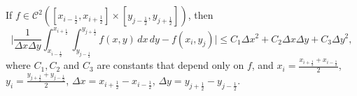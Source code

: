\begin{thrm}
	\label{prop-bound-midpoint2d}
	If $f \in \mathcal{C}^2([x_{i-\frac{1}{2}},x_{i+\frac{1}{2}}]\times [y_{j-\frac{1}{2}},y_{j+\frac{1}{2}}])$, then 
	\begin{equation}
		\bigg|\frac{1}{\Delta x \Delta y}\int_{x_{i-\frac{1}{2}}}^{x_{i+\frac{1}{2}}}
		\int_{y_{j-\frac{1}{2}}}^{y_{j+\frac{1}{2}}}{f(x,y)\,dx \,dy}-f(x_i,y_j)\bigg| \leq C_1 \Delta x^2 + C_2 \Delta x \Delta y + C_3 \Delta y^2, 
	\end{equation}
	where $C_1, C_2$  and $C_3$ are constants that depend only on $f$, and $x_i = \frac{x_{i+\frac{1}{2}} + x_{i-\frac{1}{2}}}{2}$,
	$y_i = \frac{y_{j+\frac{1}{2}} + y_{j-\frac{1}{2}}}{2}$, $\Delta x = x_{i+\frac{1}{2}}-x_{i-\frac{1}{2}}$,
	$\Delta y= y_{j+\frac{1}{2}}-y_{j-\frac{1}{2}}$.
\end{thrm}
